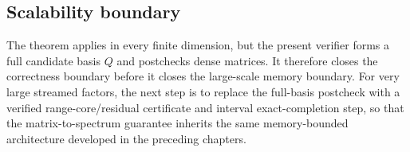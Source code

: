 \subsection{Scalability boundary}

The theorem applies in every finite dimension, but the present verifier forms a full candidate
basis \(Q\) and postchecks dense matrices.  It therefore closes the correctness
boundary before it closes the large-scale memory boundary.  For very large
streamed factors, the next step is to replace the full-basis postcheck with a
verified range-core/residual certificate and interval exact-completion step,
so that the matrix-to-spectrum guarantee inherits the same memory-bounded
architecture developed in the preceding chapters.



